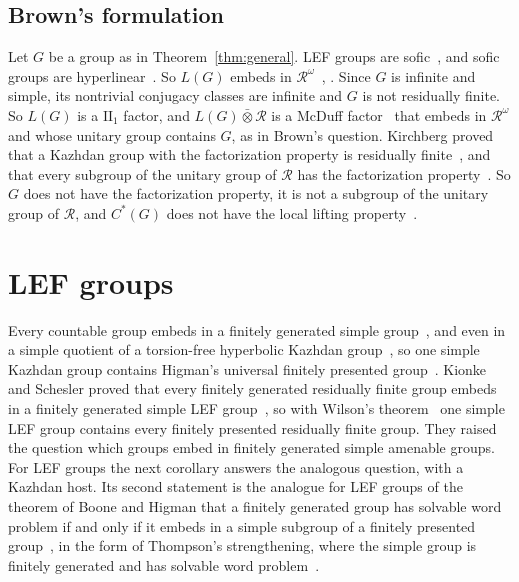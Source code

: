 \documentclass[11pt]{amsart}
\begin{document}
\subsection*{Brown's formulation}
Let $G$ be a group as in Theorem~\ref{thm:general}. LEF groups are
sofic~\cite[Example~4.5]{Pestov}, and sofic groups are
hyperlinear~\cite[Theorem~2]{ElekSzabo}. So $L(G)$ embeds in
$\mathcal R^\omega$~\cite{Kirchberg,Radulescu},
\cite[Proposition~7.1]{Ozawa}. Since $G$ is infinite and simple, its
nontrivial conjugacy classes are infinite and $G$ is not residually
finite. So $L(G)$ is a $\mathrm{II}_1$ factor, and
$L(G)\mathbin{\bar\otimes}\mathcal R$ is a McDuff factor~\cite{McDuff}
that embeds in $\mathcal R^\omega$ and whose unitary group contains $G$,
as in Brown's question. Kirchberg proved that a Kazhdan group with the
factorization property is residually
finite~\cite[Theorem~1.1]{Kirchberg}, and that every subgroup of the
unitary group of $\mathcal R$ has the factorization
property~\cite[Corollary~1.2]{Kirchberg}. So $G$ does not have the
factorization property, it is not a subgroup of the unitary group of
$\mathcal R$, and $C^*(G)$ does not have the local lifting
property~\cite[p.~527]{Ozawa}.

\section{LEF groups}\label{sec:lef}

Every countable group embeds in a finitely generated simple
group~\cite{Gorjuskin,Schupp}, and even in a simple quotient of a
torsion-free hyperbolic Kazhdan group~\cite[Theorem~1.5]{CoulonFournierFacio},
so one simple Kazhdan group contains Higman's universal finitely presented
group~\cite{Higman}. Kionke and Schesler proved that every finitely
generated residually finite group embeds in a finitely generated simple
LEF group~\cite[Theorem~1.2]{KionkeSchesler}, so with Wilson's
theorem~\cite{Wilson} one simple LEF group contains every finitely
presented residually finite group. They raised the question which
groups embed in finitely generated simple amenable groups. For LEF groups
the next corollary answers the analogous question, with a Kazhdan host.
Its second statement is the analogue for LEF groups of the theorem of
Boone and Higman that a finitely generated group has solvable word
problem if and only if it embeds in a simple subgroup of a finitely
presented group~\cite{BooneHigman}, in the form of Thompson's
strengthening, where the simple group is finitely generated and has
solvable word problem~\cite{Thompson80}.
\end{document}
